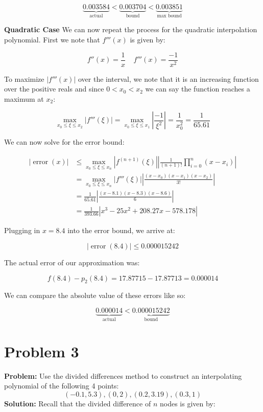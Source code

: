\documentclass{article}
\begin{document}
$$\underbrace{0.003584}_{\text{actual}}<\underbrace{0.003704}_{\text{bound}}<\underbrace{0.003851}_{\text{max bound}}$$

\textbf{Quadratic Case}
We can now repeat the process for the quadratic interpolation polynomial. First we note that $f'''(x)$ is given by:

$$f''(x)=\frac{1}{x}\ \ \ \ \ f'''(x)=\frac{-1}{x^2}$$

To maximize $|f'''(x)|$ over the interval, we note that it is an increasing function over the positive reals and since $0<x_0<x_2$ we can say the function reaches a maximum at $x_2$:

$$\max_{x_0\le\xi\le x_2}\left|f'''(\xi)\right|=\max_{x_0\le\xi\le x_1}\left|\frac{-1}{\xi^2}\right|=\frac{1}{x_0^2}=\frac{1}{65.61}$$

We can now solve for the error bound:

\begin{align*}
  |\operatorname{error}(x)|
  &\le\max_{x_0\le\xi\le x_n}\left|f^{(n+1)}(\xi)\right|\left|\frac{1}{(n+1)!} \prod_{i=0}^n (x-x_i)\right|\\
  &=\max_{x_0\le\xi\le x_n}\left|f'''(\xi)\right|\left|\frac{(x-x_0)(x-x_1)(x-x_2)}{3!}\right|\\
  &=\frac{1}{65.61}\left|\frac{(x-8.1)(x-8.3)(x-8.6)}{6}\right|\\
  &=\frac{1}{393.66}|x^3-25x^2+208.27x-578.178|
\end{align*}

Plugging in $x=8.4$ into the error bound, we arrive at:

$$|\operatorname{error}(8.4)|\le\boxed{0.000015242}$$

%

The actual error of our approximation was:

$$f(8.4)-p_2(8.4)=17.87715-17.87713=0.000014$$

We can compare the absolute value of these errors like so:

$$\underbrace{0.000014}_{\text{actual}}<\underbrace{0.000015242}_{\text{bound}}$$

\section*{Problem 3}
\textbf{Problem:} Use the divided differences method to construct an interpolating polynomial of the following 4 points:
$$(-0.1, 5.3),(0, 2),(0.2, 3.19),(0.3, 1)$$
\textbf{Solution:} Recall that the divided difference of $n$ nodes is given by:
\end{document}
